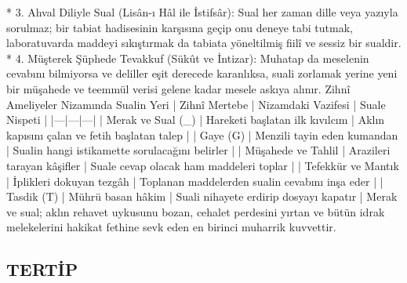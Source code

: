 \documentclass[11pt,a4paper]{article}
\begin{document}
 * 3. Ahval Diliyle Sual (Lisân-ı Hâl ile İstifsâr):
   Sual her zaman dille veya yazıyla sorulmaz; bir tabiat hadisesinin karşısına geçip onu deneye tabi tutmak, laboratuvarda maddeyi sıkıştırmak da tabiata yöneltilmiş fiilî ve sessiz bir sualdir.
 * 4. Müşterek Şüphede Tevakkuf (Sükût ve İntizar):
   Muhatap da meselenin cevabını bilmiyorsa ve deliller eşit derecede karanlıksa, suali zorlamak yerine yeni bir müşahede ve teemmül verisi gelene kadar mesele askıya alınır.
Zihnî Ameliyeler Nizamında Sualin Yeri
| Zihnî Mertebe | Nizamdaki Vazifesi | Suale Nispeti |
|---|---|---|
| Merak ve Sual (_{}) | Hareketi başlatan ilk kıvılcım | Aklın kapısını çalan ve fetih başlatan talep |
| Gaye (G) | Menzili tayin eden kumandan | Sualin hangi istikamette sorulacağını belirler |
| Müşahede ve Tahlil | Arazileri tarayan kâşifler | Suale cevap olacak ham maddeleri toplar |
| Tefekkür ve Mantık | İplikleri dokuyan tezgâh | Toplanan maddelerden sualin cevabını inşa eder |
| Tasdik (T) | Mührü basan hâkim | Suali nihayete erdirip dosyayı kapatır |
Merak ve sual; aklın rehavet uykusunu bozan, cehalet perdesini yırtan ve bütün idrak melekelerini hakikat fethine sevk eden en birinci muharrik kuvvettir.




\subsection{TERTİP}
\end{document}
